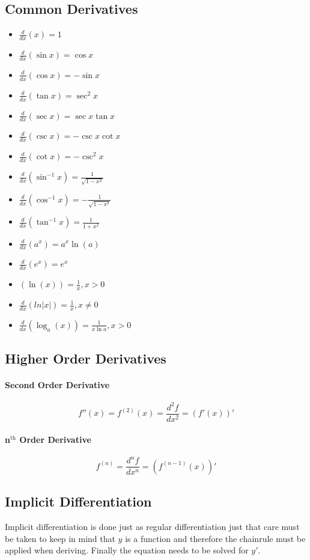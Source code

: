\documentclass[a4paper, 10pt]{article}
\begin{document}
\subsection{Common Derivatives}
\begin{multicols}{2}
    \begin{itemize}
        \item[] \( \frac{d}{dx}(x) = 1 \)
        \item[] \( \frac{d}{dx}(\sin{x}) = \cos{x} \)
        \item[] \( \frac{d}{dx}(\cos{x}) = -\sin{x} \)
        \item[] \( \frac{d}{dx}(\tan{x}) = \sec^2x \)
        \item[] \( \frac{d}{dx}(\sec x) = \sec x\tan x \)
        \item[] \( \frac{d}{dx}(\csc x) = -\csc x\cot x \)
        \item[] \( \frac{d}{dx}(\cot x) = -\csc^2 x \)
        \item[] \( \frac{d}{dx}\left(\sin^{-1}x\right) = \frac{1}{\sqrt{1-x^2}} \)
        \item[] \( \frac{d}{dx}\left(\cos^{-1}x\right) = -\frac{1}{\sqrt{1-x^2}} \)
        \item[] \( \frac{d}{dx}\left(\tan^{-1}x\right) = \frac{1}{1+x^2} \)
        \item[] \( \frac{d}{dx}\left(a^x\right) = a^x\ln(a) \)
        \item[]  \( \frac{d}{dx}\left(e^x\right) = e^x \)
        \item[] \( \left(\ln(x)\right) = \frac{1}{x}, x > 0 \)
        \item[] \( \frac{d}{dx}(ln\lvert x\rvert) = \frac{1}{x}, x\neq0 \)
        \item[] \( \frac{d}{dx}\left(\log_a(x)\right) = \frac{1}{x\ln a}, x > 0 \)
    \end{itemize}
\end{multicols}
\subsection{Higher Order Derivatives}
\paragraph{Second Order Derivative}
\[ f''(x) = f^{(2)}(x) = \frac{d^2f}{dx^2} = \left(f'(x)\right)' \]
\paragraph{n\(^{\mathrm{th}}\) Order Derivative}
\[ f^{(n)} = \frac{d^nf}{dx^n} = \left(f^{(n-1)}(x)\right)' \]
\subsection{Implicit Differentiation}
Implicit differentiation is done just as regular differentiation just that care must be taken to keep in mind that \(y\) is a function and therefore the chainrule must be applied when deriving. Finally the equation needs to be solved for \(y'\).
\end{document}
